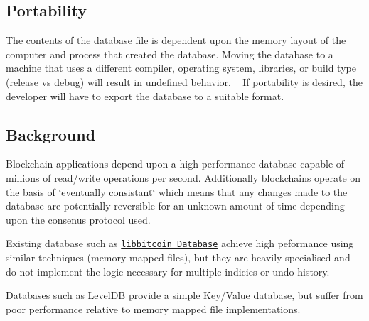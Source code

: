 \subsection*{Portability}

The contents of the database file is dependent upon the memory layout of the computer and process that created the database. Moving the database to a machine that uses a different compiler, operating system, libraries, or build type (release vs debug) will result in undefined behavior. ~\newline
 If portability is desired, the developer will have to export the database to a suitable format.

\subsection*{Background}

Blockchain applications depend upon a high performance database capable of millions of read/write operations per second. Additionally blockchains operate on the basis of \char`\"{}eventually consistant\char`\"{} which means that any changes made to the database are potentially reversible for an unknown amount of time depending upon the consenus protocol used.

Existing database such as \href{https://github.com/libbitcoin/libbitcoin-database}{\tt libbitcoin Database} achieve high peformance using similar techniques (memory mapped files), but they are heavily specialised and do not implement the logic necessary for multiple indicies or undo history.

Databases such as Level\+DB provide a simple Key/\+Value database, but suffer from poor performance relative to memory mapped file implementations. 